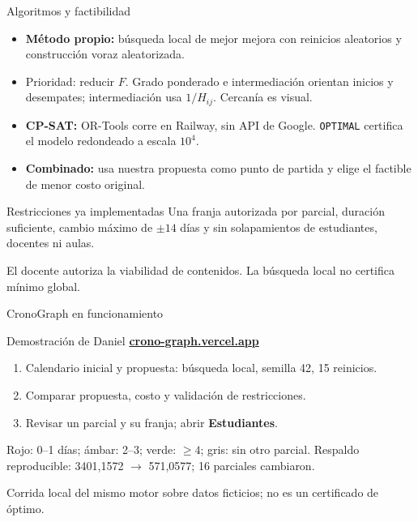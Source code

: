 \documentclass[aspectratio=169,11pt]{beamer}
\begin{document}
\begin{frame}{Algoritmos y factibilidad}
  \small
  \begin{itemize}
    \item \textbf{Método propio:} búsqueda local de mejor mejora con reinicios aleatorios y construcción voraz aleatorizada.
    \item Prioridad: reducir $F$. Grado ponderado e intermediación orientan inicios y desempates; intermediación usa $1/H_{ij}$. Cercanía es visual.
    \item \textbf{CP-SAT:} OR-Tools corre en Railway, sin API de Google. \texttt{OPTIMAL} certifica el modelo redondeado a escala $10^4$.
    \item \textbf{Combinado:} usa nuestra propuesta como punto de partida y elige el factible de menor costo original.
  \end{itemize}
  \begin{block}{Restricciones ya implementadas}
    Una franja autorizada por parcial, duración suficiente, cambio máximo de $\pm14$ días y sin solapamientos de estudiantes, docentes ni aulas.
  \end{block}
  \footnotesize El docente autoriza la viabilidad de contenidos. La búsqueda local no certifica mínimo global.
\end{frame}

\begin{frame}{CronoGraph en funcionamiento}
  \begin{block}{Demostración de Daniel}
    \href{https://crono-graph.vercel.app/}{\textbf{crono-graph.vercel.app}}
  \end{block}
  \begin{enumerate}
    \item Calendario inicial y propuesta: búsqueda local, semilla 42, 15 reinicios.
    \item Comparar propuesta, costo y validación de restricciones.
    \item Revisar un parcial y su franja; abrir \textbf{Estudiantes}.
  \end{enumerate}
  \small Rojo: 0--1 días; ámbar: 2--3; verde: $\geq4$; gris: sin otro parcial.
  \vfill\footnotesize Respaldo reproducible: 3401,1572 $\rightarrow$ 571,0577; 16 parciales cambiaron.\par
  Corrida local del mismo motor sobre datos ficticios; no es un certificado de óptimo.
\end{frame}
\end{document}
